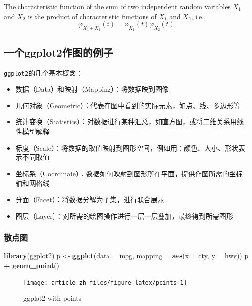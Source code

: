\documentclass[]{article}
\newenvironment{Shaded}{\begin{snugshade}}{\end{snugshade}}
\newcommand{\DataTypeTok}[1]{\textcolor[rgb]{0.13,0.29,0.53}{#1}}
\newcommand{\KeywordTok}[1]{\textcolor[rgb]{0.13,0.29,0.53}{\textbf{#1}}}
\newcommand{\NormalTok}[1]{#1}
\newcommand{\OperatorTok}[1]{\textcolor[rgb]{0.81,0.36,0.00}{\textbf{#1}}}
\newcommand{\StringTok}[1]{\textcolor[rgb]{0.31,0.60,0.02}{#1}}
\providecommand{\tightlist}{%
  \setlength{\itemsep}{0pt}\setlength{\parskip}{0pt}}
\let\BeginKnitrBlock\begin \let\EndKnitrBlock\end
\begin{document}
\BeginKnitrBlock{corollary}
\protect\hypertarget{cor:unnamed-chunk-7}{}{\label{cor:unnamed-chunk-7} }The
characteristic function of the sum of two independent random variables
\(X_1\) and \(X_2\) is the product of characteristic functions of
\(X_1\) and \(X_2\), i.e.,
\[\varphi _{X_1+X_2}(t)=\varphi _{X_1}(t) \varphi _{X_2}(t)\]
\EndKnitrBlock{corollary}

\hypertarget{ggplot2}{%
\subsection{一个ggplot2作图的例子}\label{ggplot2}}

\texttt{ggplot2}的几个基本概念：

\begin{itemize}
\tightlist
\item
  数据（Data）和映射（Mapping）：将数据映到图像
\item
  几何对象（Geometric）：代表在图中看到的实际元素，如点、线、多边形等
\item
  统计变换（Statistics）：对数据进行某种汇总，如直方图，或将二维关系用线性模型解释
\item
  标度（Scale）：将数据的取值映射到图形空间，例如用：颜色、大小、形状表示不同取值
\item
  坐标系（Coordinate）：数据如何映射到图形所在平面，提供作图所需的坐标轴和网格线
\item
  分面（Facet）：将数据分解为子集，进行联合展示
\item
  图层（Layer）：对所需的绘图操作进行一层一层叠加，最终得到所需图形
\end{itemize}

\subsubsection{散点图}

\begin{Shaded}
\begin{Highlighting}[]
\KeywordTok{library}\NormalTok{(ggplot2)}
\NormalTok{p <-}\StringTok{ }\KeywordTok{ggplot}\NormalTok{(}\DataTypeTok{data =}\NormalTok{ mpg, }\DataTypeTok{mapping =} \KeywordTok{aes}\NormalTok{(}\DataTypeTok{x =}\NormalTok{ cty, }\DataTypeTok{y =}\NormalTok{ hwy))}
\NormalTok{p }\OperatorTok{+}\StringTok{ }\KeywordTok{geom_point}\NormalTok{()}
\end{Highlighting}
\end{Shaded}

\begin{figure}

{\centering \texttt{[image: article\_zh\_files/figure-latex/points-1]} 

}

\caption{ggplot2 with points}\label{fig:points}
\end{figure}
\end{document}
